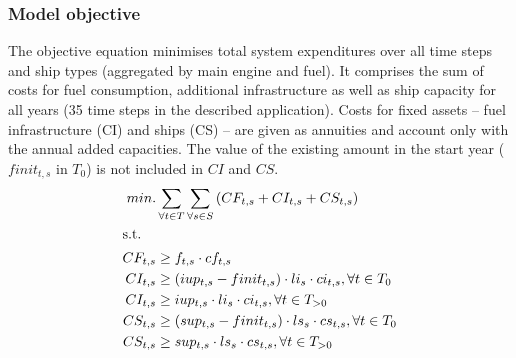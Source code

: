 \documentclass[article]{elsarticle}
\begin{document}
\subsubsection{Model objective}
The objective equation minimises total system expenditures over all time steps and ship types (aggregated by main engine and fuel). It comprises the sum of  costs for fuel consumption, additional infrastructure as well as ship capacity for all years (35 time steps in the described application). Costs for fixed assets -- fuel infrastructure (CI) and ships (CS) -- are given as annuities and account only with the annual added capacities. The value of the existing amount in the start year ($finit_{t,s}$ in $T_0$) is not included in $CI$ and $CS$.
\begin{subequations}
    \begin{align}
        min. &\sum_{\forall t \in T}\sum_{\forall s \in S}\left( CF_{t, s} + CI_{t, s} + CS_{t, s} \right)\label{eq:objective}\\
        \intertext{s.t.}
        CF_{t, s} &\geq f_{t,s} \cdot cf_{t,s}\\
        CI_{t, s} &\geq \left( iup_{t,s} - finit_{t, s} \right) \cdot li_{s} \cdot ci_{t,s}, \forall t \in T_0\\
        CI_{t, s} &\geq iup_{t,s} \cdot li_{s} \cdot ci_{t,s}, \forall t \in T_{>0}\\
        CS_{t, s} &\geq \left( sup_{t,s} - finit_{t, s} \right) \cdot ls_{s} \cdot cs_{t,s}, \forall t \in T_0\\
        CS_{t, s} &\geq sup_{t,s} \cdot ls_{s} \cdot cs_{t,s}, \forall t \in T_{>0}
    \end{align}
\end{subequations}
\end{document}
